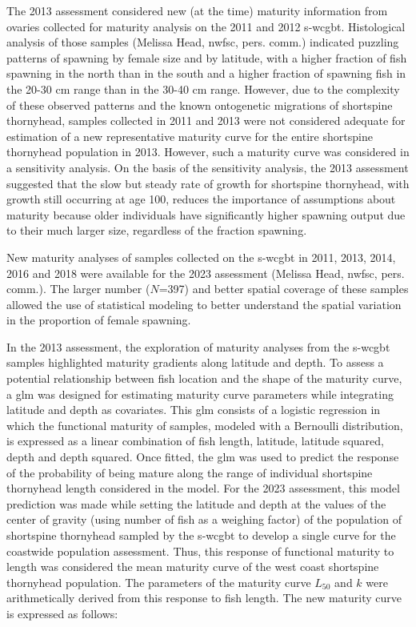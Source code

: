 \documentclass[11pt,
  letterpaper,
]{article}
\begin{document}
The 2013 assessment considered new (at the time) maturity information from ovaries collected for maturity analysis on the 2011 and 2012 \gls{s-wcgbt}. Histological analysis of those samples (Melissa Head, \gls{nwfsc}, pers. comm.) indicated puzzling patterns of spawning by female size and by latitude, with a higher fraction of fish spawning in the north than in the south and a higher fraction of spawning fish in the 20-30 cm range than in the 30-40 cm range. However, due to the complexity of these observed patterns and the known ontogenetic migrations of shortspine thornyhead, samples collected in 2011 and 2013 were not considered adequate for estimation of a new representative maturity curve for the entire shortspine thornyhead population in 2013. However, such a maturity curve was considered in a sensitivity analysis. On the basis of the sensitivity analysis, the 2013 assessment suggested that the slow but steady rate of growth for shortspine thornyhead, with growth still occurring at age 100, reduces the importance of assumptions about maturity because older individuals have significantly higher spawning output due to their much larger size, regardless of the fraction spawning.

New maturity analyses of samples collected on the \gls{s-wcgbt} in 2011, 2013, 2014, 2016 and 2018 were available for the 2023 assessment (Melissa Head, \gls{nwfsc}, pers. comm.). The larger number (\(N\)=397) and better spatial coverage of these samples allowed the use of statistical modeling to better understand the spatial variation in the proportion of female spawning.

In the 2013 assessment, the exploration of maturity analyses from the \gls{s-wcgbt} samples highlighted maturity gradients along latitude and depth. To assess a potential relationship between fish location and the shape of the maturity curve, a \gls{glm} was designed for estimating maturity curve parameters while integrating latitude and depth as covariates. This \gls{glm} consists of a logistic regression in which the functional maturity of samples, modeled with a Bernoulli distribution, is expressed as a linear combination of fish length, latitude, latitude squared, depth and depth squared. Once fitted, the \gls{glm} was used to predict the response of the probability of being mature along the range of individual shortspine thornyhead length considered in the model. For the 2023 assessment, this model prediction was made while setting the latitude and depth at the values of the center of gravity (using number of fish as a weighing factor) of the population of shortspine thornyhead sampled by the \gls{s-wcgbt} to develop a single curve for the coastwide population assessment. Thus, this response of functional maturity to length was considered the mean maturity curve of the west coast shortspine thornyhead population. The parameters of the maturity curve \(L_{50}\) and \(k\) were arithmetically derived from this response to fish length. The new maturity curve is expressed as follows:
\end{document}
